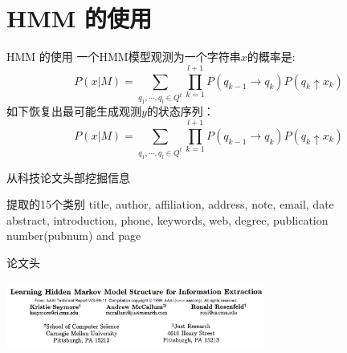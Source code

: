 \documentclass{beamer}
\begin{document}
\section{HMM 的使用}
\begin{frame}{HMM 的使用}
    一个HMM模型观测为一个字符串$x$的概率是:
    \begin{equation}
    P(x|M) = \sum_{q_1,\cdots,q_l \in Q^t} {
        \prod_{k=1}^{l+1}{
            P(q_{k-1} \rightarrow q_k) P(q_k \uparrow x_k)
        }
    }
    \end{equation}
    如下恢复出最可能生成观测$y$的状态序列：
    \begin{equation}
    P(x|M) = \sum_{q_1,\cdots,q_l \in Q^t} {
        \prod_{k=1}^{l+1}{
            P(q_{k-1} \rightarrow q_k) P(q_k \uparrow x_k)
        }
    }
    \end{equation}
\end{frame}

\begin{frame}{ 从科技论文头部挖掘信息}
    \begin{block}{提取的15个类别}
        title, author, affiliation, address, note, email, date\\
        abstract, introduction, phone, keywords, web, degree, publication number(pubnum) and page
         
    \end{block}
    \begin{block}{论文头}
    \begin{center}
        \includegraphics[width=240pt]{report5/report_header.png}
    \end{center}
    \end{block}
\end{frame}
\end{document}

